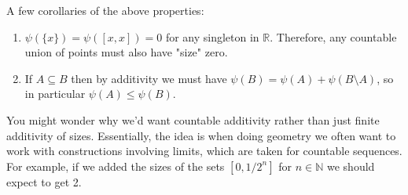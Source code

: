\documentclass[11pt,x11names]{article}
\newcommand{\nn}{\mathbb{N}}
\newcommand{\rr}{\mathbb{R}}
\begin{document}
\begin{observation}
    A few corollaries of the above properties:
    \begin{enumerate}
        \item $\psi(\{x\}) = \psi([x, x]) = 0$ for any singleton in $\rr$. Therefore, any countable union of points must also have "size" zero.
        \item If $A \subseteq B$ then by additivity we must have $\psi(B) = \psi(A) + \psi(B \setminus A)$, so in particular $\psi(A) \leq \psi(B)$.
    \end{enumerate}
\end{observation}

\begin{remark}
 You might wonder why we'd want countable additivity rather than just finite additivity of sizes. Essentially, the idea is when doing geometry we often want to work with constructions involving limits, which are taken for countable sequences. For example, if we added the sizes of the sets $[0, 1/2^n]$ for $n \in \nn$ we should expect to get 2.
\end{remark}
\end{document}
